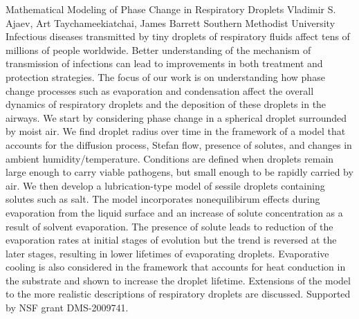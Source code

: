 \vspace{1.5ex}
\abs
{Mathematical Modeling of Phase Change in Respiratory Droplets} 
{Vladimir S. Ajaev, Art Taychameekiatchai, James Barrett}
{Southern Methodist University}
{Infectious diseases transmitted by tiny droplets of respiratory fluids affect tens of millions of people worldwide. Better understanding of the mechanism of transmission of infections can lead to improvements in both treatment and protection strategies. The focus of our work is on understanding how phase change processes such as evaporation and condensation affect the overall dynamics of respiratory droplets and the deposition of these droplets in the airways. We start by considering phase change in a spherical droplet surrounded by moist air. We find droplet radius over time in the framework of a model that accounts for the diffusion process, Stefan flow, presence of solutes, and changes in ambient humidity/temperature. Conditions are defined when droplets remain large enough to carry viable pathogens, but small enough to be rapidly carried by air. We then develop a lubrication-type model of sessile droplets containing solutes such as salt. The model incorporates  nonequilibirum effects during evaporation from the liquid surface and an increase of solute concentration as a result of solvent evaporation. The presence of solute leads to reduction of the evaporation rates at initial stages of evolution but the trend is reversed at the later stages, resulting in lower lifetimes of evaporating droplets.  Evaporative cooling is also considered in the framework that accounts for heat conduction in the substrate and shown to increase the droplet lifetime. Extensions of the model to the more realistic descriptions of respiratory droplets are discussed. Supported by NSF grant DMS-2009741.}


